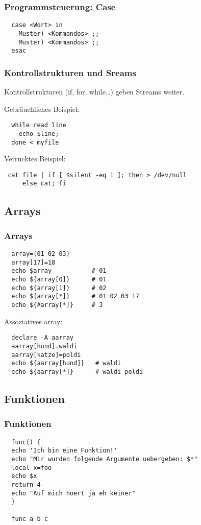 \documentclass{beamer}
\begin{document}
\begin{frame}[fragile]
 \frametitle{Programmsteuerung: Case} 
  \begin{lstlisting}
  case <Wort> in
    Muster) <Kommandos> ;;
    Muster) <Kommandos> ;;
  esac
  \end{lstlisting}
\end{frame}

\begin{frame}[fragile]
 \frametitle{Kontrollstrukturen und Sreams}
 
 Kontrollstrukturen (if, for, while…) geben Streams weiter.
 \medskip 
 
 Gebräuchliches Beispiel:
 \begin{lstlisting}
  while read line
    echo $line;
  done < myfile
 \end{lstlisting}
 
 Verrücktes Beispiel:
 \begin{lstlisting}
 cat file | if [ $silent -eq 1 ]; then > /dev/null
     else cat; fi
 \end{lstlisting}
\end{frame}

\subsection{Arrays}
\begin{frame}[fragile]
 \frametitle{Arrays}
 \begin{lstlisting}
  array=(01 02 03)
  array[17]=18
  echo $array           # 01
  echo ${array[0]}      # 01
  echo ${array[1]}      # 02
  echo ${array[*]}      # 01 02 03 17
  echo ${#array[*]}     # 3
 \end{lstlisting}
 
 Assoziatives array:
 \begin{lstlisting}
  declare -A aarray
  aarray[hund]=waldi
  aarray[katze]=poldi
  echo ${aarray[hund]}   # waldi
  echo ${aarray[*]}      # waldi poldi
 \end{lstlisting}
\end{frame}


\subsection{Funktionen}
\begin{frame}[fragile]
 \frametitle{Funktionen}
 
 \begin{lstlisting}
  func() {
  echo 'Ich bin eine Funktion!'
  echo "Mir wurden folgende Argumente uebergeben: $*"
  local x=foo
  echo $x
  return 4
  echo "Auf mich hoert ja eh keiner"
  }
  
  func a b c
 \end{lstlisting}
\end{frame}
\end{document}

